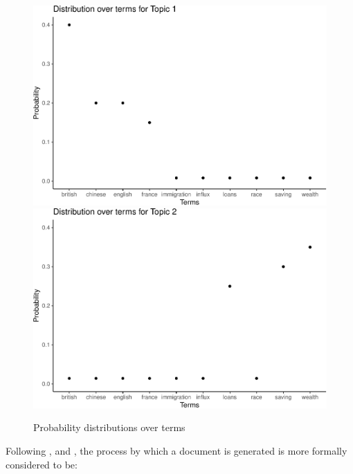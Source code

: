 \documentclass[12pt,]{article}
\begin{document}
\begin{figure}
\includegraphics[width=.49\linewidth]{svm-rmarkdown-article-example_files/figure-latex/topicsoverterms-1} \includegraphics[width=.49\linewidth]{svm-rmarkdown-article-example_files/figure-latex/topicsoverterms-2} \caption{Probability distributions over terms}\label{fig:topicsoverterms}
\end{figure}

Following \citet{BleiLafferty2009}, \citet{blei2012} and
\citet{GriffithsSteyvers2004}, the process by which a document is
generated is more formally considered to be:
\end{document}
